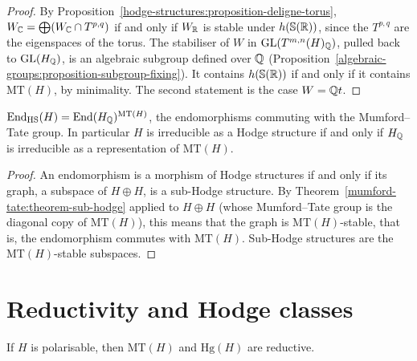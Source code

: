 \begin{proof}
By Proposition~\ref{hodge-structures:proposition-deligne-torus}, $W_{\mathbb{C}} = \bigoplus(W_{\mathbb{C}} \cap T^{p,q})$ if and only if $W_{\mathbb{R}}$ is stable under $h(\mathbb{S}(\mathbb{R}))$, since the $T^{p,q}$ are the
eigenspaces of the torus. The stabiliser of $W$ in $\mathrm{GL}(T^{m,n}(H)_{\mathbb{Q}})$, pulled back to $\mathrm{GL}(H_{\mathbb{Q}})$, is an algebraic subgroup defined over $\mathbb{Q}$
(Proposition~\ref{algebraic-groups:proposition-subgroup-fixing}). It contains $h(\mathbb{S}(\mathbb{R}))$ if and only if it contains $\mathrm{MT}(H)$, by minimality. The second statement is the case
$W = \mathbb{Q} t$.
\end{proof}

\begin{corollary}\label{mumford-tate:corollary-endomorphisms}
$\operatorname{End}_{\mathrm{HS}}(H) = \operatorname{End}(H_{\mathbb{Q}})^{\mathrm{MT}(H)}$, the endomorphisms commuting with the Mumford--Tate group. In particular $H$ is irreducible as a Hodge structure if and only if $H_{\mathbb{Q}}$ is
irreducible as a representation of $\mathrm{MT}(H)$.
\end{corollary}

\begin{proof}
An endomorphism is a morphism of Hodge structures if and only if its graph, a subspace of $H \oplus H$, is a sub-Hodge structure. By Theorem~\ref{mumford-tate:theorem-sub-hodge} applied to $H \oplus H$
(whose Mumford--Tate group is the diagonal copy of $\mathrm{MT}(H)$), this means that the graph is $\mathrm{MT}(H)$-stable, that is, the endomorphism commutes with $\mathrm{MT}(H)$. Sub-Hodge
structures are the $\mathrm{MT}(H)$-stable subspaces.
\end{proof}

\section{Reductivity and Hodge classes}\label{mumford-tate:section-reductive}

\begin{theorem}\label{mumford-tate:theorem-reductive}
If $H$ is polarisable, then $\mathrm{MT}(H)$ and $\mathrm{Hg}(H)$ are reductive.
\end{theorem}

